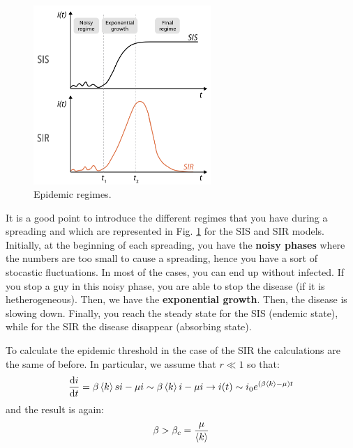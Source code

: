 \documentclass[../main/main.tex]{subfiles}
\begin{document}
\begin{figure}[h!]
\centering
\includegraphics[width=0.6\textwidth]{../lessons/image/03/6.png}
\caption{\label{fig:3_6} Epidemic regimes.}
\end{figure}

It is a good point to introduce the different regimes that you have during a spreading and which are represented in Fig. \ref{fig:3_6} for the  SIS and SIR models.
Initially, at the beginning of each spreading, you have the \textbf{noisy phases} where the numbers are too small to cause a spreading, hence you have a sort of stocastic fluctuations. In most of the cases, you can end up without infected. If you stop a guy in this noisy phase, you are able to stop the disease (if it is hetherogeneous). Then, we have the \textbf{exponential growth}. Then, the disease is slowing down. Finally, you reach the steady state for the SIS (endemic state), while for the SIR the disease disappear (absorbing state).

To calculate the epidemic threshold in the case of the SIR the calculations are the same of before. In particular, we assume that \( r \ll 1 \) so that:
\begin{equation*}
  \dv{i}{t} = \beta \expval{k} s i - \mu i \sim \beta \expval{k} i - \mu i \rightarrow i(t) \sim i_0 e^{(\beta \expval{k} - \mu  )t}
\end{equation*}
and the result is again:
\begin{equation*}
  \beta > \beta _c = \frac{\mu }{\expval{k} }
\end{equation*}
\end{document}
